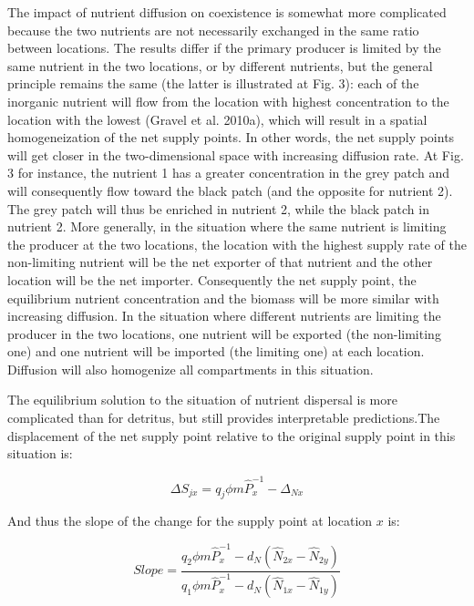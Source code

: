\documentclass[letterpaper,twocolumn,showkeys]{revtex4-1}
\begin{document}
The impact of nutrient diffusion on coexistence is somewhat more complicated because the two nutrients are not necessarily exchanged in the same ratio between locations. The results differ if the primary producer is limited by the same nutrient in the two locations, or by different nutrients, but the general principle remains the same (the latter is illustrated at Fig. 3): each of the inorganic nutrient will flow from the location with highest concentration to the location with the lowest (Gravel et al. 2010a), which will result in a spatial homogeneization of the net supply points. In other words, the net supply points will get closer in the two-dimensional space with increasing diffusion rate. At Fig. 3 for instance, the nutrient 1 has a greater concentration in the grey patch and will consequently flow toward the black patch (and the opposite for nutrient 2). The grey patch will thus be enriched in nutrient 2, while the black patch in nutrient 2. More generally, in the situation where the same nutrient is limiting the producer at the two locations, the location with the highest supply rate of the non-limiting nutrient will be the net exporter of that nutrient and the other location will be the net importer. Consequently the net supply point, the equilibrium nutrient concentration and the biomass will be more similar with increasing diffusion. In the situation where different nutrients are limiting the producer in the two locations, one nutrient will be exported (the non-limiting one) and one nutrient will be imported (the limiting one) at each location. Diffusion will also homogenize all compartments in this situation. 

	The equilibrium solution to the situation of nutrient dispersal is more complicated than for detritus, but still provides interpretable predictions.The displacement of the net supply point relative to the original supply point in this situation is:

\begin{equation}
	\label{e:bnet}
	\Delta S_{jx}=q_{j}\phi m\widehat{P}_{x}^{-1}-\Delta_{Nx}
\end{equation}

And thus the slope of the change for the supply point at location $x$ is:

\begin{equation}
	\label{e:bnet}
	Slope=\frac{q_{2}\phi m\widehat{P}_{x}^{-1}-d_{N}(\widehat{N}_{2x}-\widehat{N}_{2y})}{q_{1}\phi m\widehat{P}_{x}^{-1}-d_{N}(\widehat{N}_{1x}-\widehat{N}_{1y})}
\end{equation}
\end{document}
